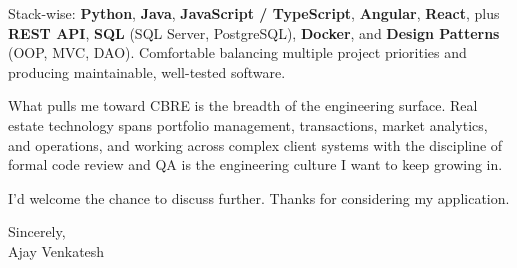 \documentclass[letterpaper,11pt]{article}
\begin{document}
Stack-wise: \textbf{Python}, \textbf{Java}, \textbf{JavaScript / TypeScript}, \textbf{Angular}, \textbf{React}, plus \textbf{REST API}, \textbf{SQL} (SQL Server, PostgreSQL), \textbf{Docker}, and \textbf{Design Patterns} (OOP, MVC, DAO). Comfortable balancing multiple project priorities and producing maintainable, well-tested software.

What pulls me toward CBRE is the breadth of the engineering surface. Real estate technology spans portfolio management, transactions, market analytics, and operations, and working across complex client systems with the discipline of formal code review and QA is the engineering culture I want to keep growing in.

I'd welcome the chance to discuss further. Thanks for considering my application.

\vspace{12pt}
Sincerely, \\
Ajay Venkatesh
\end{document}
